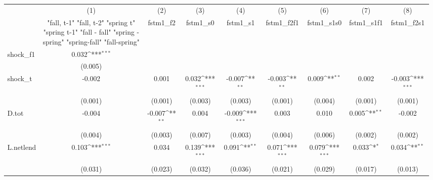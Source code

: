 {
\def\sym#1{\ifmmode^{#1}\else\(^{#1}\)\fi}
\begin{tabular}{l*{8}{c}}
\toprule
            &\multicolumn{1}{c}{(1)}&\multicolumn{1}{c}{(2)}&\multicolumn{1}{c}{(3)}&\multicolumn{1}{c}{(4)}&\multicolumn{1}{c}{(5)}&\multicolumn{1}{c}{(6)}&\multicolumn{1}{c}{(7)}&\multicolumn{1}{c}{(8)}\\
            &\multicolumn{1}{c}{  "fall, t-1" "fall, t-2" "spring t" "spring t-1"  "fall - fall" "spring - spring" "spring-fall" "fall-spring" }&\multicolumn{1}{c}{fstm1\_f2}&\multicolumn{1}{c}{fstm1\_s0}&\multicolumn{1}{c}{fstm1\_s1}&\multicolumn{1}{c}{fstm1\_f2f1}&\multicolumn{1}{c}{fstm1\_s1s0}&\multicolumn{1}{c}{fstm1\_s1f1}&\multicolumn{1}{c}{fstm1\_f2s1}\\
\midrule
shock\_f1    &       0.032\sym{***}&                     &                     &                     &                     &                     &                     &                     \\
            &     (0.005)         &                     &                     &                     &                     &                     &                     &                     \\
\addlinespace
shock\_t     &      -0.002         &       0.001         &       0.032\sym{***}&      -0.007\sym{**} &      -0.003\sym{**} &       0.009\sym{**} &       0.002         &      -0.003\sym{***}\\
            &     (0.001)         &     (0.001)         &     (0.003)         &     (0.003)         &     (0.001)         &     (0.004)         &     (0.001)         &     (0.001)         \\
\addlinespace
D.tot       &      -0.004         &      -0.007\sym{**} &       0.004         &      -0.009\sym{***}&       0.003         &       0.010         &       0.005\sym{**} &      -0.002         \\
            &     (0.004)         &     (0.003)         &     (0.007)         &     (0.003)         &     (0.004)         &     (0.006)         &     (0.002)         &     (0.002)         \\
\addlinespace
L.netlend   &       0.103\sym{***}&       0.034         &       0.139\sym{***}&       0.091\sym{**} &       0.071\sym{***}&       0.079\sym{***}&       0.033\sym{*}  &       0.034\sym{**} \\
            &     (0.031)         &     (0.023)         &     (0.032)         &     (0.036)         &     (0.021)         &     (0.029)         &     (0.017)         &     (0.013)         \\

\end{tabular}}
